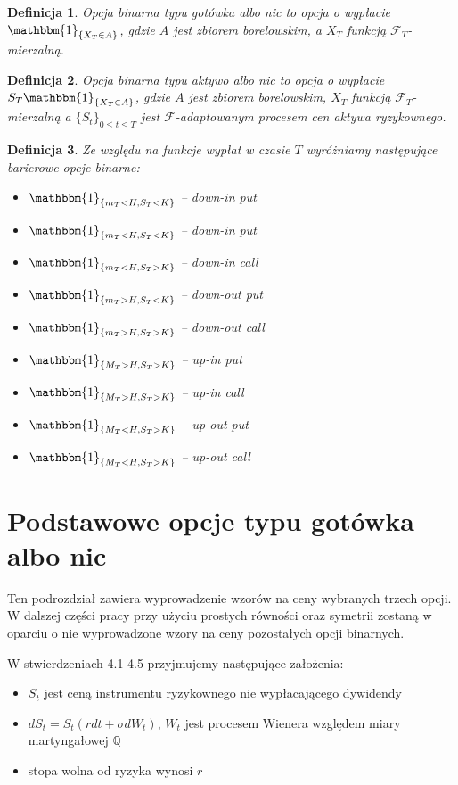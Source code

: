 \documentclass[11pt]{report}
\newtheorem{df}{Definicja}[chapter]
\begin{document}
\begin{df} Opcja binarna typu gotówka albo nic
to opcja o wypłacie $\mathbbm{1}_{ \{ X_T \in A  \} }$, gdzie $A$ jest zbiorem borelowskim, a $X_T$ funkcją $\mathscr{F}_T$-mierzalną.
\end{df}

\begin{df} Opcja binarna typu aktywo albo nic
to opcja o wypłacie $S_T\mathbbm{1}_{ \{ X_T \in A  \} }$, gdzie $A$ jest zbiorem borelowskim, $X_T$ funkcją $\mathscr{F}_T$-mierzalną a $\{ S_t \}_{0 \le t \le T}$ jest $\mathscr{F}$-adaptowanym procesem cen aktywa ryzykownego.
\end{df}

\begin{df}
Ze względu na funkcje wypłat w czasie $T$ wyróżniamy następujące barierowe opcje binarne:
\begin{itemize}
\item $\mathbbm{1}_{\{ m_T < H, S_T < K \} }$ -- down-in put
\item $\mathbbm{1}_{\{ m_T < H, S_T < K \} }$ -- down-in put
\item $\mathbbm{1}_{\{ m_T < H, S_T > K \} }$ -- down-in call
\item $\mathbbm{1}_{\{ m_T > H, S_T < K \} }$ -- down-out put
\item $\mathbbm{1}_{\{ m_T > H, S_T > K \}}$ -- down-out call
\item $\mathbbm{1}_{\{ M_T > H, S_T > K \}}$ -- up-in put
\item $\mathbbm{1}_{\{ M_T > H, S_T > K \}}$ -- up-in call
\item $\mathbbm{1}_{\{ M_T < H, S_T > K \}}$ -- up-out put
\item $\mathbbm{1}_{\{ M_T < H, S_T > K \}}$ -- up-out call   
\end{itemize}
\end{df}

\section{Podstawowe opcje typu gotówka albo nic}
Ten podrozdział zawiera wyprowadzenie wzorów na ceny wybranych trzech opcji. W dalszej części pracy przy użyciu prostych równości oraz symetrii zostaną w oparciu o nie wyprowadzone wzory na ceny pozostałych opcji binarnych.

W stwierdzeniach 4.1-4.5 przyjmujemy następujące założenia:
\begin{itemize}
\item $S_t$ jest ceną instrumentu ryzykownego nie wypłacającego dywidendy
\item $ dS_t = S_t \left(r dt + \sigma dW_t  \right) $, $W_t$ jest procesem Wienera względem miary martyngałowej $\mathbb{Q}$
\item stopa wolna od ryzyka wynosi $r$
\end{itemize}
\end{document}
